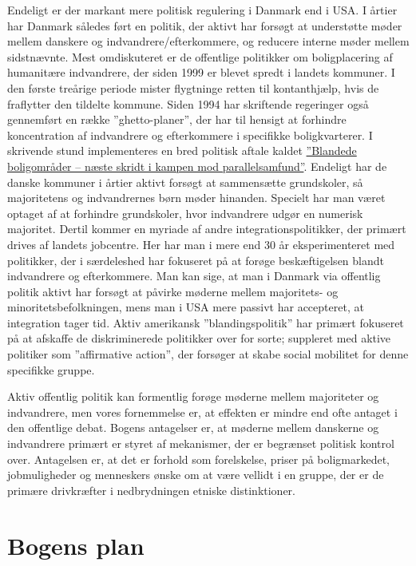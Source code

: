 \documentclass[
]{book}
\begin{document}
Endeligt er der markant mere politisk regulering i Danmark end i USA. I årtier har Danmark således ført en politik, der aktivt har forsøgt at understøtte møder mellem danskere og indvandrere/efterkommere, og reducere interne møder mellem sidstnævnte. Mest omdiskuteret er de offentlige politikker om boligplacering af humanitære indvandrere, der siden 1999 er blevet spredt i landets kommuner. I den første treårige periode mister flygtninge retten til kontanthjælp, hvis de fraflytter den tildelte kommune. Siden 1994 har skriftende regeringer også gennemført en række ''ghetto-planer'', der har til hensigt at forhindre koncentration af indvandrere og efterkommere i specifikke boligkvarterer. I skrivende stund implementeres en bred politisk aftale kaldet \href{https://www.sm.dk/media/24475/Pjece_Blandede\%20boligomr\%C3\%A5der.pdf}{''Blandede boligområder -- næste skridt i kampen mod parallelsamfund''}. Endeligt har de danske kommuner i årtier aktivt forsøgt at sammensætte grundskoler, så majoritetens og indvandrernes børn møder hinanden. Specielt har man været optaget af at forhindre grundskoler, hvor indvandrere udgør en numerisk majoritet. Dertil kommer en myriade af andre integrationspolitikker, der primært drives af landets jobcentre. Her har man i mere end 30 år eksperimenteret med politikker, der i særdeleshed har fokuseret på at forøge beskæftigelsen blandt indvandrere og efterkommere. Man kan sige, at man i Danmark via offentlig politik aktivt har forsøgt at påvirke møderne mellem majoritets- og minoritetsbefolkningen, mens man i USA mere passivt har accepteret, at integration tager tid. Aktiv amerikansk ''blandingspolitik'' har primært fokuseret på at afskaffe de diskriminerede politikker over for sorte; suppleret med aktive politiker som ''affirmative action'', der forsøger at skabe social mobilitet for denne specifikke gruppe.

Aktiv offentlig politik kan formentlig forøge møderne mellem majoriteter og indvandrere, men vores fornemmelse er, at effekten er mindre end ofte antaget i den offentlige debat. Bogens antagelser er, at møderne mellem danskerne og indvandrere primært er styret af mekanismer, der er begrænset politisk kontrol over. Antagelsen er, at det er forhold som forelskelse, priser på boligmarkedet, jobmuligheder og menneskers ønske om at være vellidt i en gruppe, der er de primære drivkræfter i nedbrydningen etniske distinktioner.

\section{Bogens plan}\label{bogens-plan}
\end{document}
